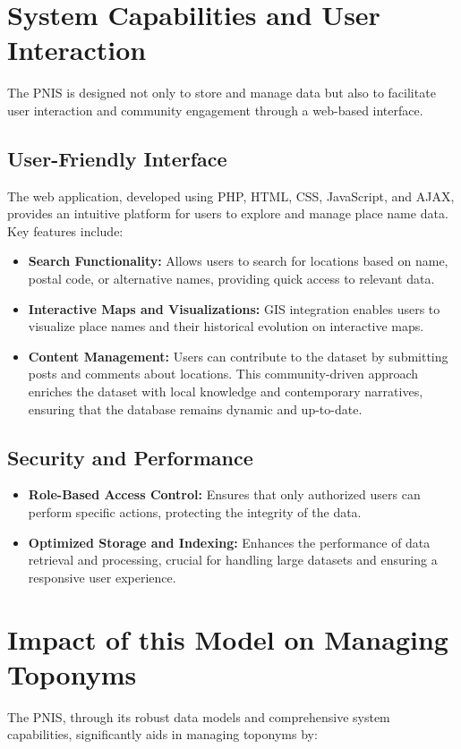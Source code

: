 \section{System Capabilities and User Interaction}
The PNIS is designed not only to store and manage data but also to facilitate user interaction and community engagement through a web-based interface.

\subsection{User-Friendly Interface}
The web application, developed using PHP, HTML, CSS, JavaScript, and AJAX, provides an intuitive platform for users to explore and manage place name data. Key features include:

\begin{itemize}
    \item \textbf{Search Functionality:} Allows users to search for locations based on name, postal code, or alternative names, providing quick access to relevant data.
    \item \textbf{Interactive Maps and Visualizations:} GIS integration enables users to visualize place names and their historical evolution on interactive maps.
    \item \textbf{Content Management:} Users can contribute to the dataset by submitting posts and comments about locations. This community-driven approach enriches the dataset with local knowledge and contemporary narratives, ensuring that the database remains dynamic and up-to-date.
\end{itemize}

\subsection{Security and Performance}
\begin{itemize}
    \item \textbf{Role-Based Access Control:} Ensures that only authorized users can perform specific actions, protecting the integrity of the data.
    \item \textbf{Optimized Storage and Indexing:} Enhances the performance of data retrieval and processing, crucial for handling large datasets and ensuring a responsive user experience.
\end{itemize}

\section{Impact of this Model on Managing Toponyms}
The PNIS, through its robust data models and comprehensive system capabilities, significantly aids in managing toponyms by:

